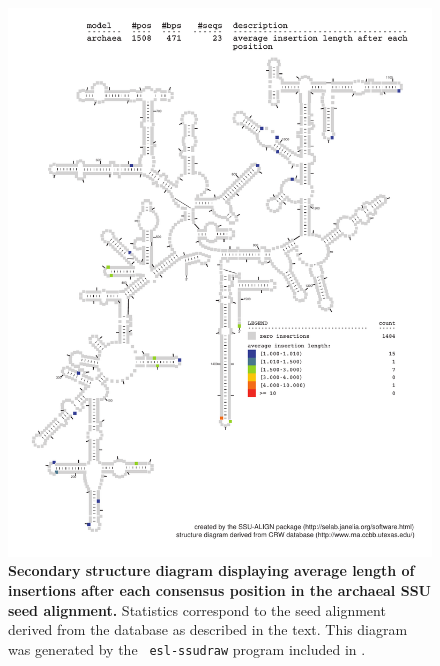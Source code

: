 \begin{figure}
\begin{center}
\includegraphics[width=5.7in]{Figures/archaea-0p1-iavglen}
\end{center}
\caption[Secondary structure diagram displaying average length of insertions
  after each consensus position in the archaeal SSU seed
  alignment]{\textbf{Secondary structure diagram displaying average
    length of insertions after each consensus position in the archaeal SSU seed
  alignment.} Statistics correspond to the  seed
  alignment derived from the  database \cite{CannoneGutell02}
  as described in the text. This diagram was generated by the {\tt
  esl-ssudraw} program included in .}
\label{fig:baciavglen}
\end{figure}


